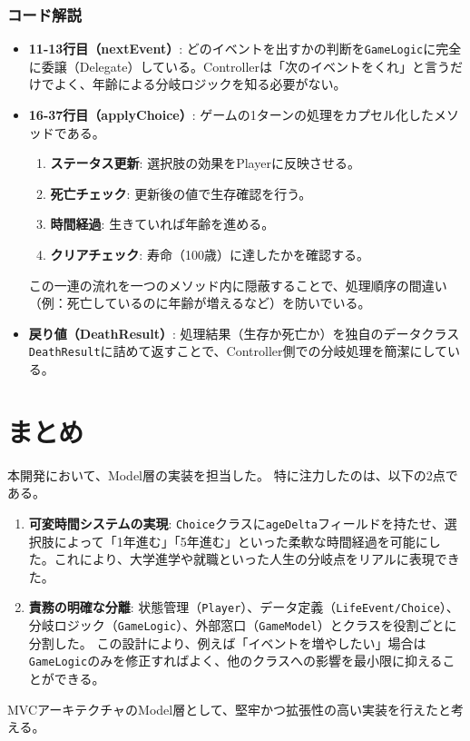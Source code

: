 \documentclass[a4paper,11pt]{jsarticle}
\begin{document}
\subsubsection*{コード解説}
\begin{itemize}
    \item \textbf{11-13行目（nextEvent）}: どのイベントを出すかの判断を\texttt{GameLogic}に完全に委譲（Delegate）している。Controllerは「次のイベントをくれ」と言うだけでよく、年齢による分岐ロジックを知る必要がない。
    \item \textbf{16-37行目（applyChoice）}: ゲームの1ターンの処理をカプセル化したメソッドである。
    \begin{enumerate}
        \item \textbf{ステータス更新}: 選択肢の効果をPlayerに反映させる。
        \item \textbf{死亡チェック}: 更新後の値で生存確認を行う。
        \item \textbf{時間経過}: 生きていれば年齢を進める。
        \item \textbf{クリアチェック}: 寿命（100歳）に達したかを確認する。
    \end{enumerate}
    この一連の流れを一つのメソッド内に隠蔽することで、処理順序の間違い（例：死亡しているのに年齢が増えるなど）を防いでいる。
    \item \textbf{戻り値（DeathResult）}: 処理結果（生存か死亡か）を独自のデータクラス\texttt{DeathResult}に詰めて返すことで、Controller側での分岐処理を簡潔にしている。
\end{itemize}

\section{まとめ}
本開発において、Model層の実装を担当した。
特に注力したのは、以下の2点である。

\begin{enumerate}
    \item \textbf{可変時間システムの実現}:
    \texttt{Choice}クラスに\texttt{ageDelta}フィールドを持たせ、選択肢によって「1年進む」「5年進む」といった柔軟な時間経過を可能にした。これにより、大学進学や就職といった人生の分岐点をリアルに表現できた。
    
    \item \textbf{責務の明確な分離}:
    状態管理（\texttt{Player}）、データ定義（\texttt{LifeEvent/Choice}）、分岐ロジック（\texttt{GameLogic}）、外部窓口（\texttt{GameModel}）とクラスを役割ごとに分割した。
    この設計により、例えば「イベントを増やしたい」場合は\texttt{GameLogic}のみを修正すればよく、他のクラスへの影響を最小限に抑えることができる。
\end{enumerate}

MVCアーキテクチャのModel層として、堅牢かつ拡張性の高い実装を行えたと考える。
\end{document}
